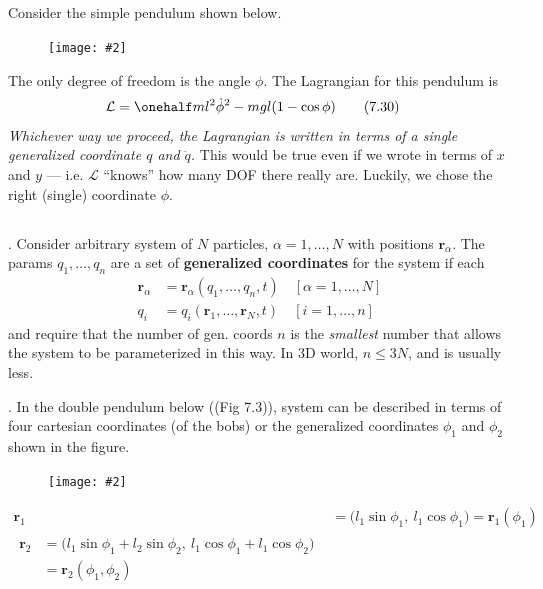 \documentclass[10pt, twocolumn]{article}
\newcommand\myfig[2][0.3\textwidth]{\begin{figure}[h!]\centering\texttt{[image: \#2]}\end{figure}}
\newcommand{\myspace}{\vspace{3\bigskipamount}}
\newcommand\p{\Needspace{10\baselineskip} \noindent}
\newcommand\tlab[1]{\tag{#1}\label{#1}}
\begin{document}
\subsection{}

\p Consider the simple pendulum shown below. 
\myfig[0.15\textwidth]{PlanePendulum.PNG}

\p The only degree of freedom is the angle $\phi$. The Lagrangian for this pendulum is
\begin{align}
\mathcal L &= \onehalf m l^2 \dot{\phi}^2 - mgl(1 - \cos\phi) \tlab{7.30} 
\end{align}
\textit{Whichever way we proceed, the Lagrangian is written in terms of a single generalized coordinate $q$ and $\dot q$.} This would be true even if we wrote in terms of $x$ and $y$ --- i.e. $\mathcal L$ ``knows'' how many DOF there really are. Luckily, we chose the right (single) coordinate $\phi$. 

\subsection{}

\p {}. Consider arbitrary system of $N$ particles, $\alpha = 1,\ldots,N$ with positions $\bm{r}_\alpha$. The params $q_1,\ldots,q_n$ are a set of \textbf{generalized coordinates} for the system if each 
\begin{align}
\bm{r}_\alpha &= \bm{r}_\alpha(q_1, \ldots, q_n, t) \quad [\alpha = 1,\ldots,N]  \tlab{7.34} \\
q_i &= q_i(\bm{r}_1, \ldots, \bm{r}_N, t) \quad [i = 1,\ldots,n]  \tlab{7.35}
\end{align}
and require that the number of gen. coords $n$ is the \textit{smallest} number that allows the system to be parameterized in this way. In 3D world, $n \le 3N$, and is usually less.

\myspace
\p {}. In the double pendulum below (\purple(Fig 7.3)), system can be described in terms of four cartesian coordinates (of the bobs) or the generalized coordinates $\phi_1$ and $\phi_2$ shown in the figure.
\myfig[0.15\textwidth]{DoublePendulum.PNG}

\begin{align}
\bm{r}_1 &= \big( l_1 \sin\phi_1, ~ l_1\cos\phi_1  \big) = \bm{r}_1(\phi_1) \tlab{7.37} \\
\begin{split}
\bm{r}_2 &= \big(l_1 \sin\phi_1 + l_2 \sin\phi_2, ~ l_1\cos\phi_1 + l_1\cos\phi_2\big) \\
&= \bm{r}_2(\phi_1, \phi_2) 
\end{split}\tlab{7.38}
\end{align}
\end{document}
